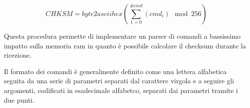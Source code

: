 \begin{equation}\label{eq:gdb-checksum}
    CHKSM = byte2asciihex \left( \sum_{1=0}^{\# cmd} \left(cmd_i\right) \ \bmod{256}\right)
\end{equation}

Questa procedura permette di implementare un parser di comandi a bassissimo impatto sulla memoria ram in quanto è possibile calcolare il checksum durante la ricezione.

Il formato dei comandi è generalmente definito come una lettera alfabetica seguita da una serie di parametri separati dal carattere virgola e a seguire gli argomenti, codificati in esadecimale alfabetco, separati dai parametri tramite i due punti\cite{site:gdbproto}.